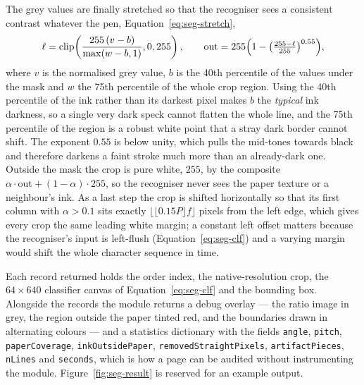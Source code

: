 The grey values are finally stretched so that the recogniser sees a consistent contrast whatever the pen, Equation~\ref{eq:seg-stretch},
\begin{equation}
\ell=\mathrm{clip}\!\left(\frac{255\,(v-b)}{\max(w-b,1)},0,255\right),\qquad
\mathrm{out}=255\Bigl(1-\bigl(\tfrac{255-\ell}{255}\bigr)^{0.55}\Bigr),
\label{eq:seg-stretch}
\end{equation}
where $v$ is the normalised grey value, $b$ is the 40th percentile of the values under the mask and $w$ the 75th percentile of the whole crop region.
Using the 40th percentile of the ink rather than its darkest pixel makes $b$ the \emph{typical} ink darkness, so a single very dark speck cannot flatten the whole line, and the 75th percentile of the region is a robust white point that a stray dark border cannot shift.
The exponent $0.55$ is below unity, which pulls the mid-tones towards black and therefore darkens a faint stroke much more than an already-dark one.
Outside the mask the crop is pure white, $255$, by the composite $\alpha\cdot\mathrm{out}+(1-\alpha)\cdot255$, so the recogniser never sees the paper texture or a neighbour's ink.
As a last step the crop is shifted horizontally so that its first column with $\alpha>0.1$ sits exactly $\lfloor \lfloor0.15P\rfloor f\rfloor$ pixels from the left edge, which gives every crop the same leading white margin; a constant left offset matters because the recogniser's input is left-flush (Equation~\ref{eq:seg-clf}) and a varying margin would shift the whole character sequence in time.

Each record returned holds the order index, the native-resolution crop, the $64\times640$ classifier canvas of Equation~\ref{eq:seg-clf} and the bounding box.
Alongside the records the module returns a debug overlay --- the ratio image in grey, the region outside the paper tinted red, and the boundaries drawn in alternating colours --- and a statistics dictionary with the fields \texttt{angle}, \texttt{pitch}, \texttt{paperCoverage}, \texttt{inkOutsidePaper}, \texttt{removedStraightPixels}, \texttt{artifactPieces}, \texttt{nLines} and \texttt{seconds}, which is how a page can be audited without instrumenting the module.
Figure~\ref{fig:seg-result} is reserved for an example output.

